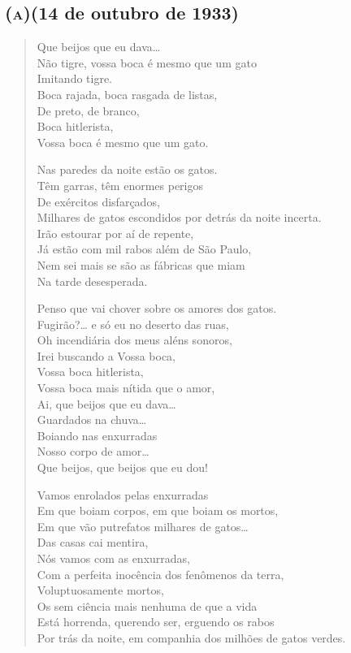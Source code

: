 \bigskip

\subsection{\textsc{(a)}\break (14 de outubro de 1933)}

\begin{verse}
Que beijos que eu dava\ldots{}\\
Não tigre, vossa boca é mesmo que um gato\\
Imitando tigre.\\
Boca rajada, boca rasgada de listas,\\
De preto, de branco,\\
Boca hitlerista,\\
Vossa boca é mesmo que um gato.

Nas paredes da noite estão os gatos.\\
Têm garras, têm enormes perigos\\
De exércitos disfarçados,\\
Milhares de gatos escondidos por detrás da noite incerta.\\
Irão estourar por aí de repente,\\
Já estão com mil rabos além de São Paulo,\\
Nem sei mais se são as fábricas que miam\\
Na tarde desesperada.

Penso que vai chover sobre os amores dos gatos.\\
Fugirão?\ldots{} e só eu no deserto das ruas,\\
Oh incendiária dos meus aléns sonoros,\\
Irei buscando a Vossa boca,\\
Vossa boca hitlerista,\\
Vossa boca mais nítida que o amor,\\
Ai, que beijos que eu dava\ldots{}\\
Guardados na chuva\ldots{}\\
Boiando nas enxurradas\\
Nosso corpo de amor\ldots{}\\
Que beijos, que beijos que eu dou!

Vamos enrolados pelas enxurradas\\
Em que boiam corpos, em que boiam os mortos,\\
Em que vão putrefatos milhares de gatos\ldots{}\\
Das casas cai mentira,\\
Nós vamos com as enxurradas,\\
Com a perfeita inocência dos fenômenos da terra,\\
Voluptuosamente mortos,\\
Os sem ciência mais nenhuma de que a vida\\
Está horrenda, querendo ser, erguendo os rabos\\
Por trás da noite, em companhia dos milhões de gatos verdes.
\end{verse}

